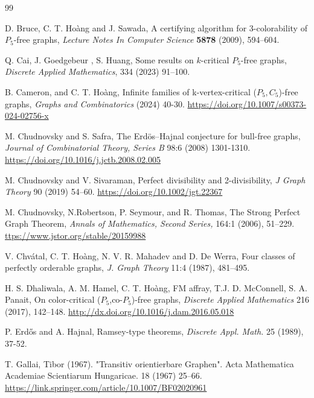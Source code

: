 \documentclass[a4paper,11pt]{article}
\theoremstyle{case}
\begin{document}
\begin{thebibliography}{99}

    D. Bruce, C. T. Ho\`ang and  J. Sawada,
    A certifying algorithm for 3-colorability of $P_5$-free graphs,
    {\sl Lecture Notes In Computer Science} {\bf 5878} (2009),
    594--604.

 Q. Cai, J. Goedgebeur , S. Huang, Some results on $k$-critical $P_5$-free graphs, {\sl Discrete Applied Mathematics}, 334 (2023) 91--100.

B. Cameron, and  C. T. Ho\`ang, 
Infinite families of k-vertex-critical ($P_5, C_5$)-free graphs,
{\it Graphs and Combinatorics} (2024) 40-30. \url{https://doi.org/10.1007/s00373-024-02756-x}

M. Chudnovsky and S. Safra, The Erd\"os–Hajnal conjecture for bull-free graphs, {\it Journal of Combinatorial Theory, Series B} 98:6 (2008) 1301-1310. \url{https://doi.org/10.1016/j.jctb.2008.02.005}

M. Chudnovsky and V. Sivaraman, Perfect divisibility and 2-divisibility, {\it J Graph Theory} 90 (2019) 54--60.  \url{https://doi.org/10.1002/jgt.22367}

M. Chudnovsky, N.Robertson, P. Seymour, and R. Thomas, The Strong Perfect Graph Theorem, 
{\it Annals of Mathematics, Second Series,}  164:1 (2006),  51--229. \url{ttps://www.jstor.org/stable/20159988}

   V. Chv\'atal, C. T. Ho\`ang, N. V. R. Mahadev and D. De Werra,
   Four classes of perfectly orderable graphs,
   {\sl J. Graph Theory} 11:4 (1987), 481--495.

 H. S. Dhaliwala, A. M. Hamel, C. T. Ho\`ang, FM affray, T.J. D. McConnell, S. A. Panait, On color-critical ($P_{5}$,co-$P_5$)-free graphs, {\sl Discrete Applied Mathematics} 216 (2017), 142--148. \url{http://dx.doi.org/10.1016/j.dam.2016.05.018}

P. Erd\H os and  A. Hajnal,
Ramsey-type theorems,
{\it Discrete Appl. Math.} 25 (1989), 37-52.


T. Gallai, Tibor (1967). "Transitiv orientierbare Graphen". Acta Mathematica Academiae Scientiarum Hungaricae. 18 (1967) 25–66. \url{https://link.springer.com/article/10.1007/BF02020961} 


\end{thebibliography}
\end{document}
